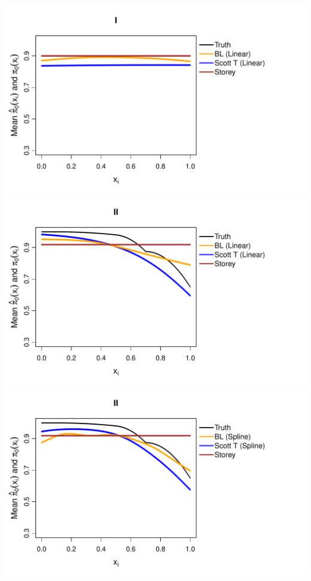 \documentclass{article}\usepackage[]{graphicx}\usepackage[]{color}
\makeatletter
\def\maxwidth{ %
  \ifdim\Gin@nat@width>\linewidth
    \linewidth
  \else
    \Gin@nat@width
  \fi
}
\newenvironment{knitrout}{}{} %
\makeatother
\begin{document}
\begin{knitrout}
{\centering \includegraphics[width=\maxwidth]{Figures/plot_of_mean_estimates_t-1} 
\includegraphics[width=\maxwidth]{Figures/plot_of_mean_estimates_t-2} 
\includegraphics[width=\maxwidth]{Figures/plot_of_mean_estimates_t-3} 
}
\end{knitrout}
\end{document}

